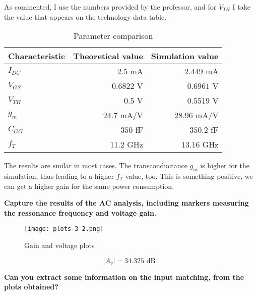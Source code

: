    \noindent As commented, I use the numbers provided by the professor, and for $V_{TH}$ I take the value that appears on the technology data table.
   \begin{table}[H] \centering
      \begin{tabular}{ |l|r|r| } \hline
          Characteristic & Theoretical value & Simulation value \\ \hline \hline
          $I_{DC}$ & $2.5$ mA & $2.449$ mA \\ \hline
          $V_{GS}$ & $0.6822$ V & $0.6961$ V \\ \hline  
          $V_{TH}$ & $0.5$ V & $0.5519$ V \\ \hline
          $g_m$ & $24.7$ mA/V & $28.96$ mA/V \\ \hline
          $C_{GG}$ & $350$ fF & $350.2$ fF \\ \hline
          $f_T$  & $11.2$ GHz & $13.16$ GHz \\ \hline
      \end{tabular}
      \caption{Parameter comparison}
   \end{table}
\noindent The results are smilar in most cases. The transconductance $g_m$ is higher for the simulation, thus leading to a higher $f_T$ value, too. This is something positive, we can get a higher gain for the same power consumption.

\begin{pexbox}{}
   \noindent \textbf{Capture the results of the AC analysis, including markers measuring the ressonance frequency and voltage gain.}
\end{pexbox}


\begin{figure} [H] \centering
   \texttt{[image: plots-3-2.png]}
   \caption{Gain and voltage plots}
\end{figure}

\begin{equation}
   |A_v| = 34.325 \text{ dB} \ .
\end{equation}

\begin{pexbox}{}
   \noindent \textbf{Can you extract some information on the input matching, from the plots obtained?}
\end{pexbox}

